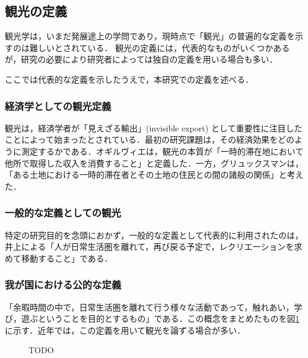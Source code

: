 \documentclass{jsarticle}
\begin{document}
\subsection{観光の定義}

\label{definition_of_tourism}

観光学は，いまだ発展途上の学問であり，現時点で「観光」の普遍的な定義を示すのは難しいとされている\cite{kanko_define}．
観光の定義には，代表的なものがいくつかあるが，研究の必要により研究者によっては独自の定義を用いる場合も多い．

ここでは代表的な定義を示したうえで，本研究での定義を述べる．


\subsubsection{経済学としての観光定義}

観光は，経済学者が「見えざる輸出」(invisible export) として重要性に注目したことによって始まったとされている\cite{kanko_define}．最初の研究課題は，その経済効果をどのように測定するかである．オギルヴィエ\cite{honshitsu}は，観光の本質が「一時的滞在地において他所で取得した収入を消費すること」と定義した．一方，グリュックスマン\cite{honshitsu2}は，「ある土地における一時的滞在者とその土地の住民との間の諸般の関係」と考えた．

\subsubsection{一般的な定義としての観光}

特定の研究目的を念頭におかず，一般的な定義として代表的に利用されたのは，井上による「人が日常生活圏を離れて，再び戻る予定で，レクリエーションを求めて移動すること」である\cite{inoue}．

\subsubsection{我が国における公的な定義}

「余暇時間の中で，日常生活圏を離れて行う様々な活動であって，触れあい，学び，遊ぶということを目的とするもの」である\cite{toshin_1995}．この概念をまとめたものを図\ref{define_kanko_by_unnyu} に示す．近年では，この定義を用いて観光を論ずる場合が多い．

\begin{figure}[h!]
\begin{center}
\caption{TODO}
\label{define_kanko_by_unnyu}
\end{center}
\end{figure}
\end{document}
